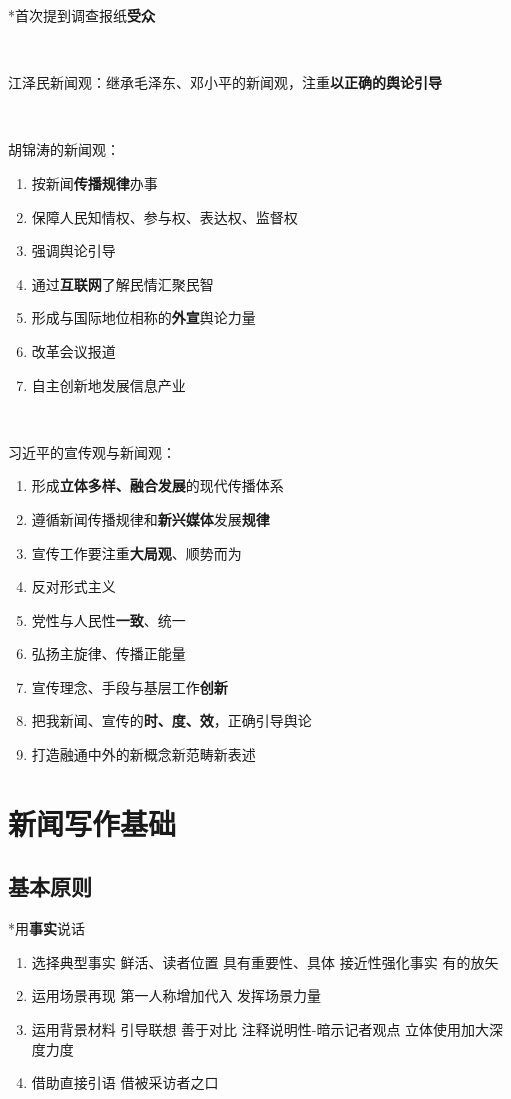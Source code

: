 \documentclass[a4paper,UTF8]{ctexart}
\begin{document}
*首次提到调查报纸\textbf{受众}

~

江泽民新闻观：继承毛泽东、邓小平的新闻观，注重\textbf{以正确的舆论引导}

~

胡锦涛的新闻观：
\begin{enumerate}
	\item 按新闻\textbf{传播规律}办事
	\item 保障人民知情权、参与权、表达权、监督权
	\item 强调舆论引导
	\item 通过\textbf{互联网}了解民情汇聚民智
	\item 形成与国际地位相称的\textbf{外宣}舆论力量
	\item 改革会议报道
	\item 自主创新地发展信息产业
\end{enumerate}

~

习近平的宣传观与新闻观：
\begin{enumerate}
	\item 形成\textbf{立体多样、融合发展}的现代传播体系
	\item 遵循新闻传播规律和\textbf{新兴媒体}发展\textbf{规律}
	\item 宣传工作要注重\textbf{大局观}、顺势而为
	\item 反对形式主义
	\item 党性与人民性\textbf{一致}、统一
	\item 弘扬主旋律、传播正能量
	\item 宣传理念、手段与基层工作\textbf{创新}
	\item 把我新闻、宣传的\textbf{时、度、效}，正确引导舆论
	\item 打造融通中外的新概念新范畴新表述
\end{enumerate}

\section{新闻写作基础}
\subsection{基本原则}

*用\textbf{事实}说话
\begin{enumerate}
	\item 选择典型事实
	\subitem 鲜活、读者位置
	\subitem 具有重要性、具体
	\subitem 接近性强化事实
	\subitem 有的放矢
    \item 运用场景再现
    \subitem 第一人称增加代入
    \subitem 发挥场景力量
    \item 运用背景材料
    \subitem 引导联想
    \subitem 善于对比
    \subitem 注释说明性-暗示记者观点
    \subitem 立体使用加大深度力度
    \item 借助直接引语
    \subitem 借被采访者之口
\end{enumerate}
\end{document}
